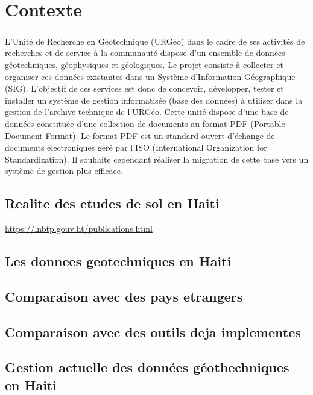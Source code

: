 \chapter*{Contexte}
\paragraph{}
L’Unité de Recherche en Géotechnique (URGéo) dans le cadre de ses activités de recherches et de service à
la communauté dispose d’un ensemble de données géotechniques, géophysiques et géologiques. Le projet
consiste à collecter et organiser ces données existantes dans un Système d’Information Géographique (SIG).
L’objectif de ces services est donc de concevoir, développer, tester et installer un système de gestion
informatisée (base des données) à utiliser dans la gestion de l’archive technique de l’URGéo. Cette unité
dispose d'une base de données constituée d’une collection de documents au format PDF (Portable Document
Format). Le format PDF est un standard ouvert d'échange de documents électroniques géré par l’ISO
(International Organization for Standardization). Il souhaite cependant réaliser la migration de cette base vers
un système de gestion plus efficace.
    \section{Realite des etudes de sol en Haiti}
    \url{https://lnbtp.gouv.ht/publications.html}
    \lipsum[1]
    \section{Les donnees geotechniques en Haiti}
    \lipsum[1]
    \section{Comparaison avec des pays etrangers}
    \lipsum[1]
    \section{Comparaison avec des outils deja implementes}
    \lipsum[1]
    \section{Gestion actuelle des données géothechniques en Haiti}
    \lipsum[1]